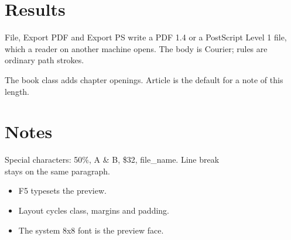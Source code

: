 \documentclass[letterpaper,12pt]{article}
\begin{document}
\section{Results}
File, Export PDF and Export PS write a PDF 1.4 or a
PostScript Level 1 file, which a reader on another machine
opens. The body is Courier; rules are ordinary path strokes.

The book class adds chapter openings. Article is the default for a
note of this length.

\newpage
\section{Notes}
Special characters: 50\%, A \& B, \$32, file\_name. Line break\\
stays on the same paragraph.

\begin{itemize}
\item F5 typesets the preview.
\item Layout cycles class, margins and padding.
\item The system 8x8 font is the preview face.
\end{itemize}
\end{document}

